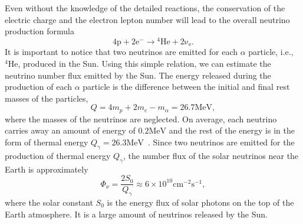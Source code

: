 Even without the knowledge of the detailed reactions, the conservation of the electric charge and the electron lepton number will lead to the overall neutrino production formula
\begin{equation}
\mathrm{4p+2e^- \to {}^4He + 2\nu_e }.
\end{equation}
It is important to notice that two neutrinos are emitted for each $\alpha$ particle, i.e., ${}^4\mathrm{He}$, produced in the Sun. Using this simple relation, we can estimate the neutrino number flux emitted by the Sun. The energy released during the production of each $\alpha$ particle is the difference between the initial and final rest masses of the particles,
\begin{equation}
Q=4m_p+2m_e-m_{\alpha}=26.7\mathrm{MeV},
\end{equation}
where the masses of the neutrinos are neglected. On average, each neutrino carries away an amount of energy of $0.2\mathrm{MeV}$ and the rest of the energy is in the form of thermal energy $Q_\gamma=26.3\mathrm{MeV}$~\cite{Adelberger2011a}. %
Since two neutrinos are emitted for the production of thermal energy $Q_\gamma$, the number flux of the solar neutrinos near the Earth is approximately
\begin{equation}
\Phi_\nu = \frac{2 S_0}{Q_\gamma} \approx 6\times 10^{10} \mathrm{cm^{-2}s^{-1}},
\end{equation}
where the solar constant $S_0$ is the energy flux of solar photons on the top of the Earth atmosphere. It is a large amount of neutrinos released by the Sun.



